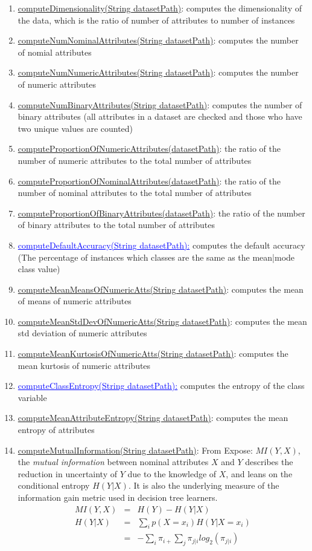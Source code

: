\documentclass[a4paper,12pt, english]{article}
\begin{document}
\begin{enumerate}
	\item \underline{computeDimensionality(String datasetPath)}: computes the dimensionality of the data, which is the ratio of number of attributes to number of instances
	\item \underline{computeNumNominalAttributes(String datasetPath)}: computes the number of nomial attributes
	\item \underline{computeNumNumericAttributes(String datasetPath)}: computes the number of numeric attributes
	\item \underline{computeNumBinaryAttributes(String datasetPath)}: computes the number of binary attributes (all attributes in a dataset are checked and those who have two unique values are counted)
	\item \underline{computeProportionOfNumericAttributes(datasetPath)}: the ratio of the number of numeric attributes to the total number of attributes
	\item \underline{computeProportionOfNominalAttributes(datasetPath)}: the ratio of the number of nominal attributes to the total number of attributes
	\item \underline{computeProportionOfBinaryAttributes(datasetPath)}: the ratio of the number of binary attributes to the total number of attributes
	\item \textcolor{blue}{\underline{computeDefaultAccuracy(String datasetPath):}}  computes the default accuracy (The percentage of instances which classes are the same as the mean|mode class value) 
	\item \underline{computeMeanMeansOfNumericAtts(String datasetPath)}:  computes the mean of means of numeric attributes
	\item \underline{computeMeanStdDevOfNumericAtts(String datasetPath)}:  computes the mean std deviation of numeric attributes
	\item \underline{computeMeanKurtosisOfNumericAtts(String datasetPath)}:   computes the mean kurtosis of numeric attributes 
	\item \textcolor{blue}{\underline{computeClassEntropy(String datasetPath):}} computes the entropy of the class variable
	\item \underline{computeMeanAttributeEntropy(String datasetPath)}:  computes the mean entropy of attributes
	\item \underline{computeMutualInformation(String datasetPath)}: From Expose: $MI(Y,X)$, the \emph{mutual information} between nominal attributes $X$ and $Y$ describes the reduction in uncertainty of $Y$ due to the knowledge of $X$, and leans on the conditional entropy $H(Y|X)$. It is also the underlying measure of the information gain metric used in decision tree learners. \begin{eqnarray} MI(Y,X)&=&H(Y)-H(Y|X) \\ H(Y|X)&=&\sum_{i}p(X=x_{i})H(Y|X=x_{i}) \\ &=&-\sum_{i}\pi_{i+} \sum_{j}\pi_{j|i}log_{2}(\pi_{j|i}) \end{eqnarray}

\end{enumerate}
\end{document}
